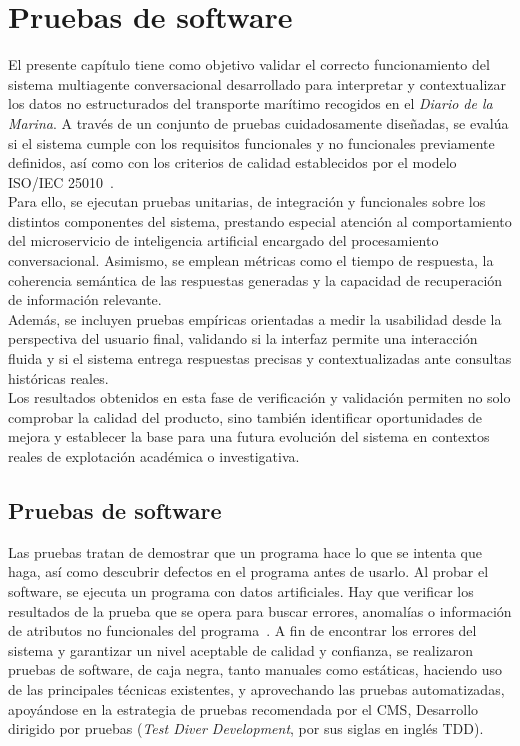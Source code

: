 \chapter{Pruebas de software}
\label{chap:chapter3}


El presente capítulo tiene como objetivo validar el correcto funcionamiento del sistema multiagente conversacional desarrollado para interpretar y contextualizar los datos no estructurados del transporte marítimo recogidos en el \textit{Diario de la Marina}. A través de un conjunto de pruebas cuidadosamente diseñadas, se evalúa si el sistema cumple con los requisitos funcionales y no funcionales previamente definidos, así como con los criterios de calidad establecidos por el modelo ISO/IEC 25010~\cite{iso25010-2023}.\\
Para ello, se ejecutan pruebas unitarias, de integración y funcionales sobre los distintos componentes del sistema, prestando especial atención al comportamiento del microservicio de inteligencia artificial encargado del procesamiento conversacional. Asimismo, se emplean métricas como el tiempo de respuesta, la coherencia semántica de las respuestas generadas y la capacidad de recuperación de información relevante.\\
Además, se incluyen pruebas empíricas orientadas a medir la usabilidad desde la perspectiva del usuario final, validando si la interfaz permite una interacción fluida y si el sistema entrega respuestas precisas y contextualizadas ante consultas históricas reales.\\
Los resultados obtenidos en esta fase de verificación y validación permiten no solo comprobar la calidad del producto, sino también identificar oportunidades de mejora y establecer la base para una futura evolución del sistema en contextos reales de explotación académica o investigativa.

\section{Pruebas de software}

Las pruebas tratan de demostrar que un programa hace lo que se intenta que haga, así como descubrir defectos en el programa antes de usarlo. Al probar el software, se ejecuta un programa con datos artificiales. Hay que verificar los resultados de la prueba que se opera para buscar errores, anomalías o información de atributos no funcionales del
programa~\cite{sommerville2011software}. A fin de encontrar los errores del sistema y garantizar un nivel aceptable de calidad y confianza, se realizaron pruebas de software, de caja negra, tanto manuales como estáticas, haciendo uso de las principales técnicas existentes, y aprovechando las pruebas automatizadas, apoyándose en la estrategia de pruebas recomendada por el CMS, Desarrollo dirigido por pruebas (\textit{Test Diver Development}, por sus siglas en inglés TDD).

